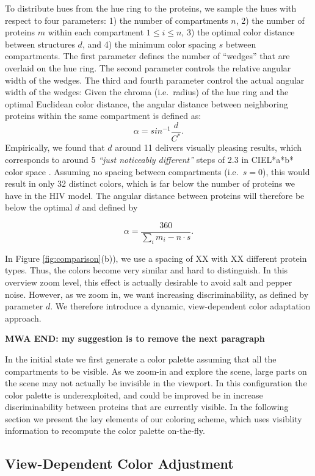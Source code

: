 \documentclass[review,journal]{vgtc}         %
\begin{document}
To distribute hues from the hue ring to the proteins, we sample the hues with respect to four parameters: 1) the number of compartments $n$, 2) the number of proteins $m$ within each compartment $1 \leq i \leq n$, 3) the optimal color distance between structures $d$, and 4) the minimum color spacing $s$ between compartments. 
The first parameter defines the number of ``wedges'' that are overlaid on the hue ring. 
The second parameter controls the relative angular width of the wedges. 
The third and fourth parameter control the actual angular width of the wedges: 
Given the chroma (i.e.\, radius) of the hue ring and the optimal Euclidean color distance, the angular distance between neighboring proteins within the same compartment is defined as: 
	\[
	\alpha = sin^{-1}\frac{d}{C^*}. 
\]
Empirically, we found that $d$ around 11 delivers visually pleasing results, which corresponds to around 5 \textit{``just noticeably different''} steps of 2.3 in CIEL*a*b* color space \cite{lee2013perceptually}. 
Assuming no spacing between compartments (i.e.\, $s=0$), this would result in only 32 distinct colors, which is far below the number of proteins we have in the HIV model. 
The angular distance between proteins will therefore be below the optimal $d$ and defined by 

	\[
	\alpha = \frac{360}{\sum_{i} m_i - n \cdot s}. 
\]

In Figure \ref{fig:comparison}(b)), we use a spacing of XX with XX different protein types. 
Thus, the colors become very similar and hard to distinguish. 
In this overview zoom level, this effect is actually desirable to avoid salt and pepper noise. 
However, as we zoom in, we want increasing discriminability, as defined by parameter $d$. 
We therefore introduce a dynamic, view-dependent color adaptation approach. 
  
\textbf{MWA END: my suggestion is to remove the next paragraph}

In the initial state we first generate a color palette assuming that all the compartments to be visible.
As we zoom-in and explore the scene, large parts on the scene may not actually be invisible in the viewport.
In this configuration the color palette is underexploited, and could be improved be in increase discriminability between proteins that are currently visible.  
In the following section we present the key elements of our coloring scheme, which uses visiblity information to recompute the color palette on-the-fly.

\subsection{View-Dependent Color Adjustment}
\end{document}
